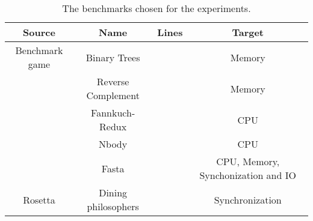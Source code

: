 \begin{table}[]
    \begin{tabular}{||c c c c||}
    \hline
    Source & Name & Lines & Target \\[0.5ex] 
    \hline\hline
    Benchmark game & Binary Trees &  & Memory \\
    & Reverse Complement &  & Memory \\
    & Fannkuch-Redux &  & CPU \\
    & Nbody &  & CPU \\
    & Fasta &  & CPU, Memory, Synchonization and IO \\
    Rosetta & Dining philosophers &  & Synchronization \\ [1ex] 
    \hline
    \end{tabular}
    \caption{The benchmarks chosen for the experiments.}
    \label{tab:benchmarks}
\end{table}